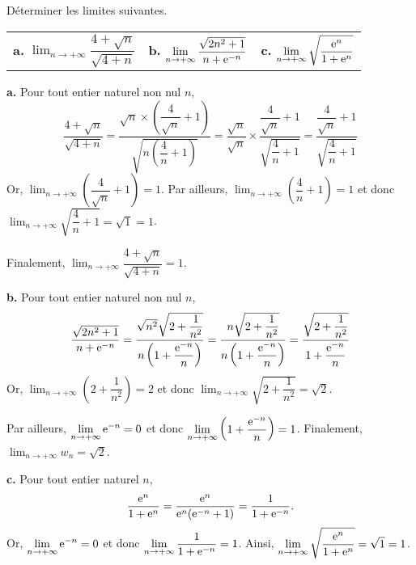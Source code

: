 \documentclass[11pt,fleqn]{book} %
\begin{document}
\begin{exercise}[topic=lim03]Déterminer les limites suivantes.

\begin{tabularx}{\linewidth}{XXX}
\textbf{a.} $\displaystyle\lim_{n\to +\infty}\dfrac{4+\sqrt{n}}{\sqrt{4+n}}$ & \textbf{b.} $\displaystyle\lim_{n\to +\infty}\dfrac{\sqrt{2n^2+1}}{n+\mathrm{e}^{-n}}$ & \textbf{c.} $\displaystyle\lim_{n\to +\infty}\sqrt{\dfrac{\mathrm{e}^n}{1+\mathrm{e}^n}}$
\end{tabularx}
\vskip10pt\end{exercise}

\begin{solution}

\textbf{a.} Pour tout entier naturel non nul $n$, 
\[ \dfrac{4+\sqrt{n}}{\sqrt{4+n}} = \dfrac{\sqrt{n} \times \left(\dfrac{4}{\sqrt{n}}+1\right)}{\sqrt{n\left(\dfrac{4}{n}+1\right)}} = \dfrac{\sqrt{n}}{\sqrt{n}} \times \dfrac{\dfrac{4}{\sqrt{n}}+1}{\sqrt{\dfrac{4}{n}+1}} = \dfrac{\dfrac{4}{\sqrt{n}}+1}{\sqrt{\dfrac{4}{n}+1}}\]
Or, $\displaystyle\lim_{n \to + \infty}\left(\dfrac{4}{\sqrt{n}}+1\right)=1$. Par ailleurs, $\displaystyle\lim_{n \to + \infty}\left(\dfrac{4}{n}+1\right)=1$ et donc $\displaystyle\lim_{n \to + \infty}\sqrt{\dfrac{4}{n}+1}=\sqrt{1}=1$. 

Finalement,  $\displaystyle\lim_{n \to + \infty} \dfrac{4+\sqrt{n}}{\sqrt{4+n}}=1$.


\textbf{b.} Pour tout entier naturel non nul $n$,
\[\dfrac{\sqrt{2n^2+1}}{n+\mathrm{e}^{-n}}=\dfrac{\sqrt{n^2}\sqrt{2+\dfrac{1}{n^2}}}{n\left(1+\dfrac{\mathrm{e}^{-n}}{n}\right)}=\dfrac{n\sqrt{2+\dfrac{1}{n^2}}}{n\left(1+\dfrac{\mathrm{e}^{-n}}{n}\right)}=\dfrac{\sqrt{2+\dfrac{1}{n^2}}}{1+\dfrac{\mathrm{e}^{-n}}{n}}\]
Or, $\displaystyle\lim_{n\to +\infty}\left(2+\dfrac{1}{n^2}\right)=2$ et donc $\displaystyle\lim_{n\to +\infty}\sqrt{2+\dfrac{1}{n^2}}=\sqrt{2}$. 

Par ailleurs,  $\displaystyle\lim_{n\to +\infty}\mathrm{e}^{-n}=0$ et donc $\displaystyle\lim_{n\to +\infty}\left(1+\dfrac{\mathrm{e}^{-n}}{n}\right)=1$. Finalement, $\displaystyle\lim_{n\to +\infty}w_n=\sqrt{2}$.


\textbf{c.} Pour tout entier naturel $n$, 
\[\dfrac{\mathrm{e}^n}{1+\mathrm{e}^n}=\dfrac{\mathrm{e}^n}{\mathrm{e}^n(\mathrm{e}^{-n}+1)}=\dfrac{1}{1+\mathrm{e}^{-n}}.\]
Or, $\displaystyle\lim_{n \to + \infty}\mathrm{e}^{-n}=0$ et donc $\displaystyle\lim_{n \to + \infty}\dfrac{1}{1+\mathrm{e}^{-n}}=1$. Ainsi, $\displaystyle\lim_{n \to + \infty}\sqrt{\dfrac{\mathrm{e}^n}{1+\mathrm{e}^n}}=\sqrt{1}=1$.\end{solution}
\end{document}

